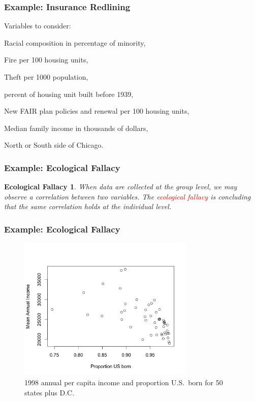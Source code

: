 \documentclass[hyperref={colorlinks=false},compress,handout,10pt]{beamer}
\let\olditem\item
\renewcommand{\item}{\setlength{\itemsep}{0.5\baselineskip}\olditem}
\begin{document}
\begin{frame}
    \frametitle{Example: Insurance Redlining}
    Variables to consider:
    \begin{description}
        \item[\texttt{race}] Racial composition in percentage of minority,
        \item[\texttt{fire}] Fire per 100 housing units,
        \item[\texttt{theft}] Theft per 1000 population,
        \item[\texttt{age}] percent of housing unit built before 1939,
        \item[\texttt{involact}] New FAIR plan policies and renewal per 100 housing units,
        \item[\texttt{income}] Median family income in thousands of dollars,
        \item[\texttt{side}] North or South side of Chicago.
    \end{description}
\end{frame}

\newtheorem{DEFecofallacy}{Ecological Fallacy}
\begin{frame}
    \frametitle{Example: Ecological Fallacy}
    \begin{DEFecofallacy}
       When data are collected at the group level, we may observe 
       a correlation between two variables.  The \textcolor{red}{ecological
       fallacy} is concluding that the same correlation holds at the
       individual level. 
    \end{DEFecofallacy}
\end{frame}

\begin{frame}
    \frametitle{Example: Ecological Fallacy}
    \begin{figure}
        \centering
        \caption{1998 annual per capita income and proportion U.S.~born for 50
        states plus D.C.}
        \includegraphics[width=0.75\textwidth]{images/FigureFarawayFigure11dot1.png}
    \end{figure}
\end{frame}
\end{document}
